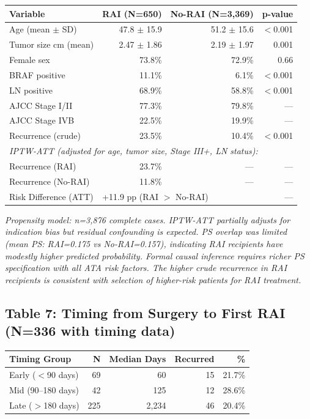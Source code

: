 \documentclass{article}
\begin{document}
\begin{tabular}{lrrr}
\toprule
Variable & RAI (N=650) & No-RAI (N=3,369) & p-value \\
\midrule
Age (mean $\pm$ SD)    & 47.8 $\pm$ 15.9 & 51.2 $\pm$ 15.6 & $<$0.001 \\
Tumor size cm (mean)   & 2.47 $\pm$ 1.86 & 2.19 $\pm$ 1.97 & 0.001 \\
Female sex             & 73.8\% & 72.9\% & 0.66 \\
BRAF positive          & 11.1\% & 6.1\% & $<$0.001 \\
LN positive            & 68.9\% & 58.8\% & $<$0.001 \\
AJCC Stage I/II        & 77.3\% & 79.8\% & --- \\
AJCC Stage IVB         & 22.5\% & 19.9\% & --- \\
Recurrence (crude)     & 23.5\% & 10.4\% & $<$0.001 \\
\midrule
\multicolumn{4}{l}{\textit{IPTW-ATT (adjusted for age, tumor size, Stage III+, LN status):}} \\
Recurrence (RAI)       & 23.7\% & --- & --- \\
Recurrence (No-RAI)    & 11.8\% & --- & --- \\
Risk Difference (ATT)  & \multicolumn{2}{l}{+11.9 pp (RAI $>$ No-RAI)} & --- \\
\bottomrule
\end{tabular}

\vspace{0.3cm}
\noindent\textit{Propensity model: n=3,876 complete cases. IPTW-ATT partially adjusts for indication bias
but residual confounding is expected. PS overlap was limited (mean PS: RAI=0.175 vs No-RAI=0.157),
indicating RAI recipients have modestly higher predicted probability. Formal causal inference requires
richer PS specification with all ATA risk factors. The higher crude recurrence in RAI recipients is
consistent with selection of higher-risk patients for RAI treatment.}

\subsection*{Table 7: Timing from Surgery to First RAI (N=336 with timing data)}
\begin{tabular}{lrrrr}
\toprule
Timing Group & N & Median Days & Recurred & \% \\
\midrule
Early ($<$90 days)     &  69 &   60 & 15 & 21.7\% \\
Mid (90--180 days)     &  42 &  125 & 12 & 28.6\% \\
Late ($>$180 days)     & 225 & 2,234 & 46 & 20.4\% \\
\bottomrule
\end{tabular}
\end{document}
